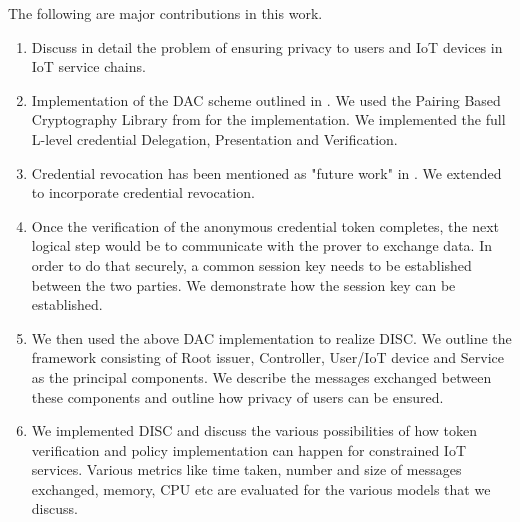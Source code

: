 \documentclass[journal]{IEEEtran}
\begin{document}
The following are major contributions in this work.
\begin{enumerate}[label=\alph*)]
	\item Discuss in detail the problem of ensuring privacy to users and IoT devices in IoT service chains.
	\item Implementation of the DAC scheme outlined in \cite{CamenischDD17}. We used the Pairing Based Cryptography Library from \cite{pbc} for the implementation. We implemented the full L-level credential Delegation, Presentation and Verification.
	\item Credential revocation has been mentioned as "future work" in \cite{CamenischDD17}. We extended \cite{CamenischDD17} to incorporate credential revocation.
	\item Once the verification of the anonymous credential token completes, the next logical step would be to communicate with the prover to exchange data. In order to do that securely, a common session key needs to be established between the two parties. We demonstrate how the session key can be established.
	\item We then used the above DAC implementation to realize DISC. We outline the framework consisting of Root issuer, Controller, User/IoT device and Service as the principal components. We describe the messages exchanged between these components and outline how privacy of users can be ensured.
	\item We implemented DISC and discuss the various possibilities of how token verification and policy implementation can happen for constrained IoT services. Various metrics like time taken, number and size of messages exchanged, memory, CPU etc are evaluated for the various models that we discuss. 
\end{enumerate}
\end{document}
